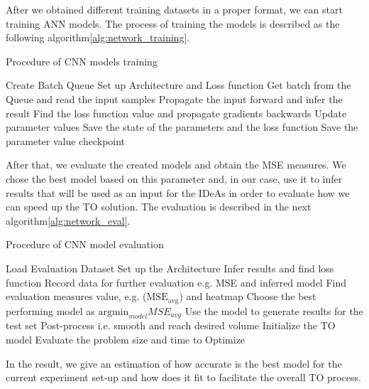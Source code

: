 After we obtained different training datasets in a proper format, we can start training ANN models.
The process of training the models is described as the following algorithm\ref{alg:network_training}. 
\begin{algorithm}
	\caption{Procedure of CNN models training}\label{alg:network_training}
	\begin{algorithmic}[0]
			\State Create Batch Queue
			\State Set up Architecture and Loss function 
				\State Get batch from the Queue and read the input samples
				\State Propagate the input forward and infer the result
				\State Find the loss function value and propagate gradients backwards
				\State Update parameter values
				\State Save the state of the parameters and the loss function
			\EndWhile
			\State Save the parameter value checkpoint
		\EndFor
	\end{algorithmic}
\end{algorithm}
\medskip

After that, we evaluate the created models and obtain the MSE measures.
We chose the best model based on this parameter and, in our case, use it to infer results that will be used as an input for the IDeAs in order to evaluate how we can speed up the TO solution. 
The evaluation is described in the next algorithm\ref{alg:network_eval}.
\begin{algorithm}
	\caption{Procedure of CNN model evaluation}\label{alg:network_eval}
	\begin{algorithmic}[0]
			\State Load Evaluation Dataset
			\State Set up the Architecture
				\State Infer results and find loss function
				\State Record data for further evaluation e.g. MSE and inferred model
			\EndFor
			\State Find evaluation measures value, e.g. ($\mathrm{MSE_{avg}}$) and heatmap
		\EndFor
		\State Choose the best performing model	as $\mathrm{argmin}_{model} MSE_{avg}$
		\State Use the model to generate results for the test set
				\State Post-process i.e. smooth and reach desired volume
				\State Initialize the TO model
				\State Evaluate the problem size and time to Optimize
			\EndFor
		\EndIf
	\end{algorithmic}
\end{algorithm}
\medskip

In the result, we give an estimation of how accurate is the best model for the current experiment set-up and how does it fit to facilitate the overall TO process.  
